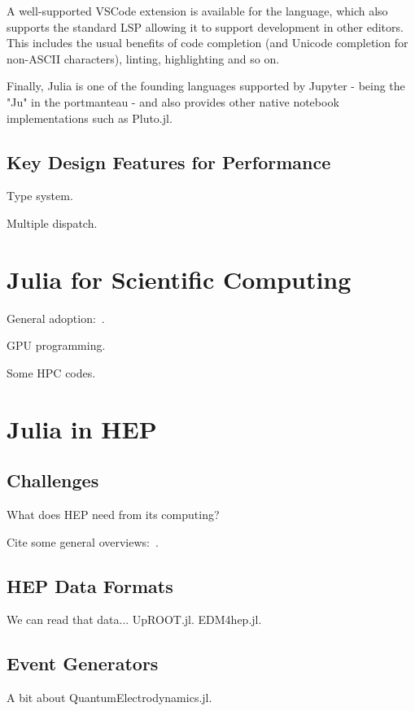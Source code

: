 \documentclass{webofc}
\begin{document}
A well-supported VSCode extension is available for the language, which also supports the standard LSP allowing it to support development in other editors. This includes 
the usual benefits of code completion (and Unicode completion for non-ASCII characters), linting, highlighting and so on.

Finally, Julia is one of the founding languages supported by Jupyter - being the "Ju" in the portmanteau - and also provides other native notebook implementations such as Pluto.jl. 

\subsection{Key Design Features for Performance}

Type system.

Multiple dispatch.

\section{Julia for Scientific Computing}

General adoption:~\cite{perkel-julia-science}.

GPU programming.

Some HPC codes.

\section{Julia in HEP}

\subsection{Challenges}

What does HEP need from its computing?

Cite some general overviews:~\cite{Stanitzki:2020bnx,eschle2023potential}.

\subsection{HEP Data Formats}

We can read that data... UpROOT.jl. EDM4hep.jl.

\subsection{Event Generators}

A bit about QuantumElectrodynamics.jl.
\end{document}
